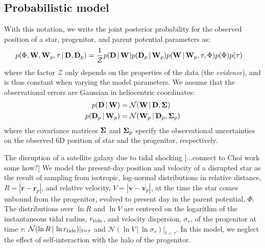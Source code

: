\documentclass[letterpaper,12pt,preprint]{aastex}
\newcommand{\given}{\,|\,}
\newcommand{\D}{{\bf D}}
\newcommand{\W}{{\bf W}}
\newcommand{\bSigma}{{\bf \Sigma}}
\newcommand{\rtide}{r_{\rm tide}}
\newcommand{\bs}{\boldsymbol}
\begin{document}
\subsection{Probabilistic model}
With this notation, we write the joint posterior probability for the observed position of a star, progenitor, and parent potential parameters as:
\begin{align}
	p(\Phi, \W, \W_p, \tau \given \D, \D_p) &= \frac{1}{\mathcal{Z}} p(\D \given \W) p(\D_p \given \W_p) 
												       p(\W \given \W_p, \tau, \Phi) 
												       p(\Phi) p(\tau)
\end{align}
where the factor $\mathcal{Z}$ only depends on the properties of the data (the \emph{evidence}), and is thus constant when varying the model parameters. We assume that the observational errors are Gaussian in heliocentric coordinates:
\begin{align}
	p(\D \given \W) &= \mathcal{N}(\W \given \D, \bSigma)\\
	p(\D_p \given \W_p) &= \mathcal{N}(\W_p \given \D_p, \bSigma_p)
\end{align}
where the covariance matrices $\bSigma$ and $\bSigma_p$ specify the observational uncertainties on the observed 6D position of star and the progenitor, respectively. 

The disruption of a satellite galaxy due to tidal shocking [...connect to Choi work some how?] We model the present-day position and velocity of a disrupted star as the result of sampling from isotropic, log-normal distributions in relative distance, $R=\left\vert \bs{r}-\bs{r}_p \right\vert$, and relative velocity, $V=\left\vert \bs{v}-\bs{v}_p \right\vert$, at the time the star comes unbound from the progenitor, evolved to present day in the parent potential, $\Phi$. The distributions over $\ln R$ and $\ln V$ are centered on the logarithm of the instantaneous tidal radius, $\rtide$, and velocity dispersion, $\sigma_v$, of the progenitor at time $\tau$: $\mathcal{N}(\ln R \given \ln\rtide)\vert_{t=\tau}$ and $\mathcal{N}(\ln V \given \ln \sigma_v)\vert_{t=\tau}$. In this model, we neglect the effect of self-interaction with the halo of the progenitor. 
\end{document}
